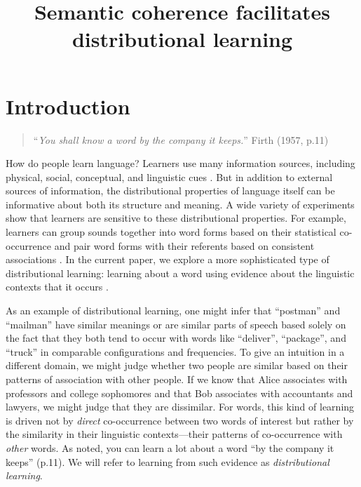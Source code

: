 \documentclass[man,longtable, floatmark]{my-apa6}
\title{Semantic coherence facilitates distributional learning}
\begin{document}
\maketitle

\setcounter{secnumdepth}{3}

\section{Introduction}

\begin{quote}
``\emph{You shall know a word by the company it keeps.}'' Firth (1957, p.11)
\end{quote}

How do people learn language? Learners use many information sources, including physical, social, conceptual, and linguistic cues \citep{clark1988, markman1991, gleitman1990, baldwin1993, hollich2000}. But in addition to external sources of information, the distributional properties of language itself can be informative about both its structure and meaning. A wide variety of experiments show that learners are sensitive to these distributional properties. For example, learners can group sounds together into word forms based on their statistical co-occurrence \citep{saffran1996a, saffran1996b} and pair word forms with their referents based on consistent associations \citep{yu2007,smith2008}. In the current paper, we explore a more sophisticated type of distributional learning: learning about a word using evidence about the linguistic contexts that it occurs \citep{smith1966, maratsos1980, braine1987, redington1998}.

As an example of distributional learning, one might infer that ``postman'' and ``mailman'' have similar meanings or are similar parts of speech based solely on the fact that they both tend to occur with words like ``deliver'', ``package'', and ``truck'' in comparable configurations and frequencies. To give an intuition in a different domain, we might judge whether two people are similar based on their patterns of association with other people. If we know that Alice associates with professors and college sophomores and that Bob associates with accountants and lawyers, we might judge that they are dissimilar. For words, this kind of learning is driven not by \emph{direct} co-occurrence between two words of interest but rather by the similarity in their linguistic contexts---their patterns of co-occurrence with \emph{other} words. As \citet{firth1957} noted, you can learn a lot about a word ``by the company it keeps'' (p.11). We will refer to learning from such evidence as \emph{distributional learning}.
\end{document}
